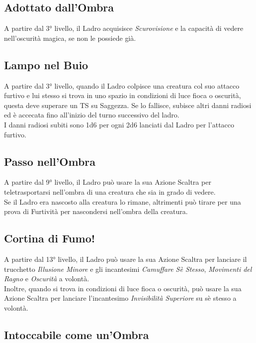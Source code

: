 \subsection{Adottato dall'Ombra}

A partire dal 3° livello, il Ladro acquisisce \textit{Scurovisione} e la capacità di vedere nell'oscurità magica, se non le possiede già.

\subsection{Lampo nel Buio}

A partire dal 3° livello, quando il Ladro colpisce una creatura col suo attacco furtivo e lui stesso si trova in uno spazio in condizioni di luce fioca o oscurità, questa deve superare un TS su Saggezza. Se lo fallisce, subisce altri danni radiosi ed è accecata fino all'inizio del turno successivo del ladro. \\ I danni radiosi subiti sono 1d6 per ogni 2d6 lanciati dal Ladro per l'attacco furtivo.

\subsection{Passo nell'Ombra}

A partire dal 9° livello, il Ladro può usare la sua Azione Scaltra per teletrasportarsi nell'ombra di una creatura che sia in grado di vedere. \\ Se il Ladro era nascosto alla creatura lo rimane, altrimenti può tirare per una prova di Furtività per nascondersi nell'ombra della creatura.

\subsection{Cortina di Fumo!}

A partire dal 13° livello, il Ladro può usare la sua Azione Scaltra per lanciare il trucchetto \textit{Illusione Minore} e gli incantesimi \textit{Camuffare Sè Stesso}, \textit{Movimenti del Ragno} e \textit{Oscurità} a volontà. \\ Inoltre, quando si trova in condizioni di luce fioca o oscurità, può usare la sua Azione Scaltra per lanciare l'incantesimo \textit{Invisibilità Superiore} su sè stesso a volontà.

\subsection{Intoccabile come un'Ombra}

